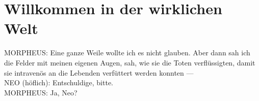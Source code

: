\section{Willkommen in der wirklichen Welt\protect\footnotemark}
\begin{playdialog}
MORPHEUS: Eine ganze Weile wollte ich es nicht glauben. Aber dann sah ich die Felder mit meinen eigenen Augen, sah, wie sie die Toten verflüssigten, damit sie intravenös an die Lebenden verfüttert werden konnten — \\

NEO (höflich): Entschuldige, bitte.\\

MORPHEUS: Ja, Neo?\\


\end{playdialog}
